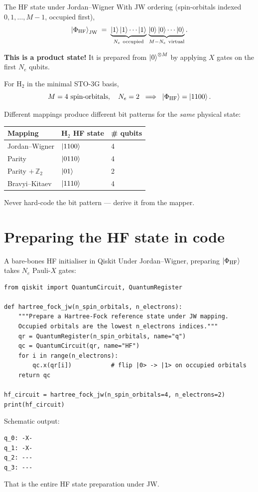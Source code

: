 \documentclass[10pt,aspectratio=169]{beamer}
\begin{document}
\begin{frame}{The HF state under Jordan--Wigner}
With JW ordering (spin-orbitals indexed $0,1,\ldots,M-1$, occupied first),
\[
\ket{\Phi_{\mathrm{HF}}}_{\mathrm{JW}}
\;=\;
\underbrace{\ket{1}\ket{1}\cdots\ket{1}}_{N_e\ \text{occupied}}\,
\underbrace{\ket{0}\ket{0}\cdots\ket{0}}_{M-N_e\ \text{virtual}}.
\]

\textbf{This is a product state!} It is prepared from $\ket{0}^{\otimes M}$ by applying $X$ gates on the first $N_e$ qubits.

\medskip
For $\mathrm{H}_2$ in the minimal STO-3G basis,
\[
M=4\text{ spin-orbitals},\quad N_e=2\;\;\Longrightarrow\;\;\ket{\Phi_{\mathrm{HF}}}=\ket{1100}.
\]

\medskip
Different mappings produce different bit patterns for the \emph{same} physical state:
\begin{center}
\begin{tabular}{lll}
\toprule
Mapping & H$_2$ HF state & \# qubits \\
\midrule
Jordan--Wigner            & $\ket{1100}$ & 4 \\
Parity                    & $\ket{0110}$ & 4 \\
Parity $+\,\mathbb{Z}_2$  & $\ket{01}$   & 2 \\
Bravyi--Kitaev            & $\ket{1110}$ & 4 \\
\bottomrule
\end{tabular}
\end{center}
Never hard-code the bit pattern --- derive it from the mapper.
\end{frame}

\section{Preparing the HF state in code}

\begin{frame}[fragile]{A bare-bones HF initialiser in Qiskit}
Under Jordan--Wigner, preparing $\ket{\Phi_{\mathrm{HF}}}$ takes $N_e$ Pauli-$X$ gates:
\begin{lstlisting}
from qiskit import QuantumCircuit, QuantumRegister

def hartree_fock_jw(n_spin_orbitals, n_electrons):
    """Prepare a Hartree-Fock reference state under JW mapping.
    Occupied orbitals are the lowest n_electrons indices."""
    qr = QuantumRegister(n_spin_orbitals, name="q")
    qc = QuantumCircuit(qr, name="HF")
    for i in range(n_electrons):
        qc.x(qr[i])           # flip |0> -> |1> on occupied orbitals
    return qc

hf_circuit = hartree_fock_jw(n_spin_orbitals=4, n_electrons=2)
print(hf_circuit)
\end{lstlisting}

\smallskip
Schematic output:
\begin{verbatim}
q_0: -X-
q_1: -X-
q_2: ---
q_3: ---
\end{verbatim}
That is the entire HF state preparation under JW.
\end{frame}
\end{document}
